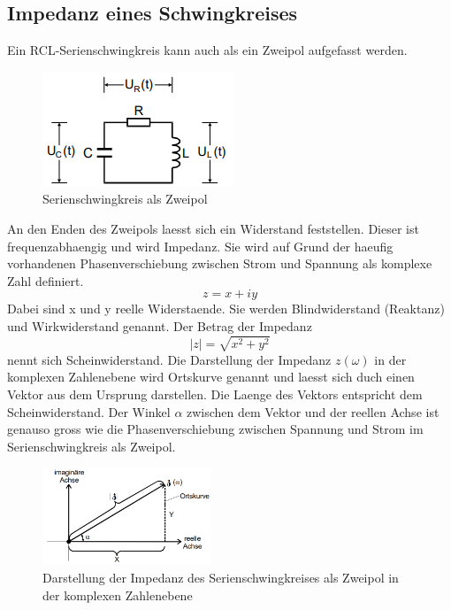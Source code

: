 \documentclass[titlepage=firstcover, captions=tableheading]{scrartcl}
\begin{document}
\subsection{Impedanz eines Schwingkreises}
Ein RCL-Serienschwingkreis kann auch als ein Zweipol aufgefasst werden. 
\begin{figure}[H]
    \centering
    \includegraphics{"Schaltkreis_RCL.png"}
    \caption{Serienschwingkreis als Zweipol}
\end{figure}
An den Enden des Zweipols laesst sich ein Widerstand feststellen. Dieser ist frequenzabhaengig und wird Impedanz. Sie wird auf Grund der haeufig vorhandenen Phasenverschiebung zwischen Strom und Spannung als komplexe Zahl definiert.
\begin{equation}
    z=x+iy \nonumber
\end{equation}
Dabei sind x und y reelle Widerstaende. Sie werden Blindwiderstand (Reaktanz) und Wirkwiderstand genannt. Der Betrag der Impedanz 
\begin{equation}
    |z|=\sqrt{x^2+y^2} \nonumber
\end{equation}
nennt sich Scheinwiderstand. Die Darstellung der Impedanz $z(\omega)$ in der komplexen Zahlenebene wird Ortskurve genannt und laesst sich duch einen Vektor aus dem Ursprung darstellen. Die Laenge des Vektors entspricht dem Scheinwiderstand. Der Winkel $\alpha$ zwischen dem Vektor und der reellen Achse ist genauso gross wie die Phasenverschiebung zwischen Spannung und Strom im Serienschwingkreis als Zweipol.
\begin{figure}[H]
    \centering
    \includegraphics[width=0.45\textwidth]{"RCL_Serienschwingkreis_komplex.png"}
    \caption{Darstellung der Impedanz des Serienschwingkreises als Zweipol in der komplexen Zahlenebene}
\end{figure}
\end{document}
